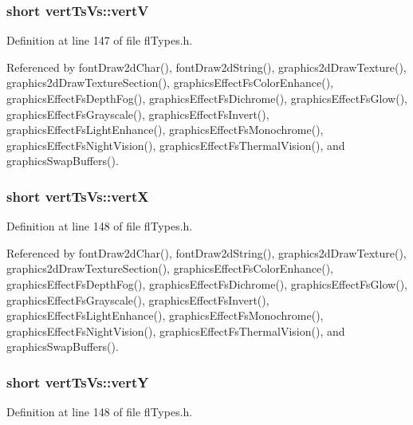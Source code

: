 \subsubsection{\setlength{\rightskip}{0pt plus 5cm}short {\bf vert\-Ts\-Vs::vert\-V}}\label{structvertTsVs_19540ba7d3f948bfeff2e2230958e6f0}




Definition at line 147 of file fl\-Types.h.

Referenced by font\-Draw2d\-Char(), font\-Draw2d\-String(), graphics2d\-Draw\-Texture(), graphics2d\-Draw\-Texture\-Section(), graphics\-Effect\-Fs\-Color\-Enhance(), graphics\-Effect\-Fs\-Depth\-Fog(), graphics\-Effect\-Fs\-Dichrome(), graphics\-Effect\-Fs\-Glow(), graphics\-Effect\-Fs\-Grayscale(), graphics\-Effect\-Fs\-Invert(), graphics\-Effect\-Fs\-Light\-Enhance(), graphics\-Effect\-Fs\-Monochrome(), graphics\-Effect\-Fs\-Night\-Vision(), graphics\-Effect\-Fs\-Thermal\-Vision(), and graphics\-Swap\-Buffers().
\subsubsection{\setlength{\rightskip}{0pt plus 5cm}short {\bf vert\-Ts\-Vs::vert\-X}}\label{structvertTsVs_9a200b5f9dc0c010c3cba2dad0511267}




Definition at line 148 of file fl\-Types.h.

Referenced by font\-Draw2d\-Char(), font\-Draw2d\-String(), graphics2d\-Draw\-Texture(), graphics2d\-Draw\-Texture\-Section(), graphics\-Effect\-Fs\-Color\-Enhance(), graphics\-Effect\-Fs\-Depth\-Fog(), graphics\-Effect\-Fs\-Dichrome(), graphics\-Effect\-Fs\-Glow(), graphics\-Effect\-Fs\-Grayscale(), graphics\-Effect\-Fs\-Invert(), graphics\-Effect\-Fs\-Light\-Enhance(), graphics\-Effect\-Fs\-Monochrome(), graphics\-Effect\-Fs\-Night\-Vision(), graphics\-Effect\-Fs\-Thermal\-Vision(), and graphics\-Swap\-Buffers().
\subsubsection{\setlength{\rightskip}{0pt plus 5cm}short {\bf vert\-Ts\-Vs::vert\-Y}}\label{structvertTsVs_52b66321252b77d699242c6c52bd550a}




Definition at line 148 of file fl\-Types.h.


